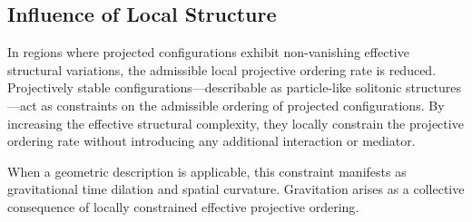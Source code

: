 \subsection{Influence of Local Structure}
  \label{subsec:influence-of-local-structure}

  In regions where projected configurations exhibit non-vanishing effective
  structural variations, the admissible local projective ordering rate is
  reduced.
  Projectively stable configurations---describable as particle-like solitonic
  structures---act as constraints on the admissible ordering of projected
  configurations.
  By increasing the effective structural complexity, they locally constrain
  the projective ordering rate without introducing any additional interaction
  or mediator.

  When a geometric description is applicable, this constraint manifests as
  gravitational time dilation and spatial curvature.
  Gravitation arises as a collective consequence of locally constrained
  effective projective ordering.
